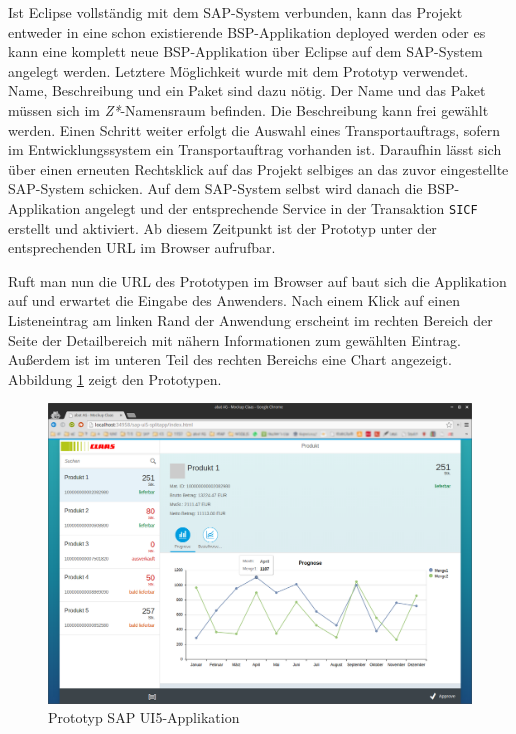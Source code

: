 Ist Eclipse vollständig mit dem SAP-System verbunden, kann das Projekt entweder in eine schon existierende BSP-Applikation deployed werden oder es kann eine komplett neue BSP-Applikation über Eclipse auf dem SAP-System angelegt werden. Letztere Möglichkeit wurde mit dem Prototyp verwendet. Name, Beschreibung und ein Paket sind dazu nötig. Der Name und das Paket müssen sich im \textit{Z*}-Namensraum befinden. Die Beschreibung kann frei gewählt werden. Einen Schritt weiter erfolgt die Auswahl eines Transportauftrags, sofern im Entwicklungssystem ein Transportauftrag vorhanden ist. Daraufhin lässt sich über einen erneuten Rechtsklick auf das Projekt selbiges an das zuvor eingestellte SAP-System schicken. Auf dem SAP-System selbst wird danach die BSP-Applikation angelegt und der entsprechende Service in der Transaktion \texttt{SICF} erstellt und aktiviert. Ab diesem Zeitpunkt ist der Prototyp unter der entsprechenden URL im Browser aufrufbar.\par Ruft man nun die URL des Prototypen im Browser auf baut sich die Applikation auf und erwartet die Eingabe des Anwenders. Nach einem Klick auf einen Listeneintrag am linken Rand der Anwendung erscheint im rechten Bereich der Seite der Detailbereich mit nähern Informationen zum gewählten Eintrag. Außerdem ist im unteren Teil des rechten Bereichs eine Chart angezeigt. Abbildung \ref{fig:prototypsplitapp} zeigt den Prototypen.

\vspace{1em}
\begin{figure}[htb]
  \centering
  \includegraphics[width=1\linewidth]{abb/sapui5_final_splitapp}
  \caption[Prototyp SAP UI5-Applikation]{Prototyp SAP UI5-Applikation}
  \label{fig:prototypsplitapp}
\end{figure}